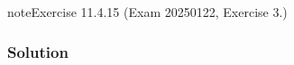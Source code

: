 \documentclass[letterpaper,10pt,english]{jupyterBook}
\begin{document}
\begin{sphinxadmonition}{note}{Exercise 11.4.15 (Exam 2025\sphinxhyphen{}01\sphinxhyphen{}22, Exercise 3.)}



\begin{figure}[htbp]
\centering

\noindent{}
\end{figure}
\subsubsection*{Solution}




\begin{savenotes}\sphinxattablestart
\centering
\begin{tabulary}{\linewidth}[t]{|T|T|T|}
\hline


\end{tabulary}
\end{savenotes}
\end{sphinxadmonition}
\end{document}
